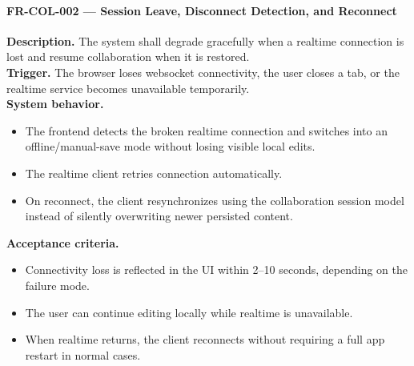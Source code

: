 \paragraph{FR-COL-002 --- Session Leave, Disconnect Detection, and Reconnect}
\textbf{Description.} The system shall degrade gracefully when a realtime connection is lost and resume
collaboration when it is restored.\\
\textbf{Trigger.} The browser loses websocket connectivity, the user closes a tab, or the realtime
service becomes unavailable temporarily.\\
\textbf{System behavior.}
\begin{itemize}
  \item The frontend detects the broken realtime connection and switches into an offline/manual-save
  mode without losing visible local edits.
  \item The realtime client retries connection automatically.
  \item On reconnect, the client resynchronizes using the collaboration session model instead of
  silently overwriting newer persisted content.
\end{itemize}
\textbf{Acceptance criteria.}
\begin{itemize}
  \item Connectivity loss is reflected in the UI within 2--10 seconds, depending on the failure mode.
  \item The user can continue editing locally while realtime is unavailable.
  \item When realtime returns, the client reconnects without requiring a full app restart in normal cases.
\end{itemize}

